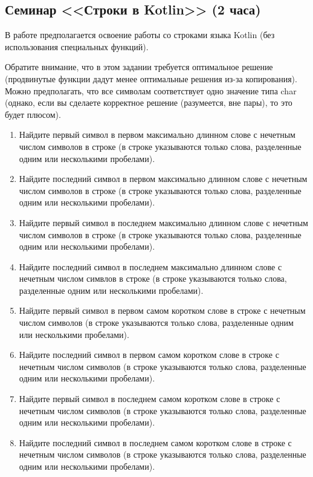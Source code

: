 \subsection{Семинар <<Строки в Kotlin>> (2 часа)}

В работе предполагается освоение работы со строками языка Kotlin (без использования специальных функций).

Обратите внимание, что в этом задании требуется оптимальное решение 
(продвинутые функции дадут менее оптимальные решения из-за копирования). Можно предполагать,
что все символам соответствует одно значение типа char (однако,
если вы сделаете корректное решение (разумеется, вне пары), то это будет плюсом).



\begin{enumerate}
\item Найдите первый символ в первом максимально длинном слове с нечетным числом символов в строке (в строке указываются только слова, разделенные одним или несколькими пробелами). 
\item Найдите последний символ в первом максимально длинном слове с нечетным числом символов в строке (в строке указываются только слова, разделенные одним или несколькими пробелами). 
\item Найдите первый символ в последнем максимально длинном слове с нечетным числом символов в строке (в строке указываются только слова, разделенные одним или несколькими пробелами). 
\item Найдите последний символ в последнем максимально длинном слове с нечетным числом симвлов в строке (в строке указываются только слова, разделенные одним или несколькими пробелами). 
\item Найдите первый символ в первом самом коротком слове в строке с нечетным числом символов (в строке указываются только слова, разделенные одним или несколькими пробелами). 
\item Найдите последний символ в первом самом коротком слове в строке с нечетным числом символов (в строке указываются только слова, разделенные одним или несколькими пробелами). 
\item Найдите первый символ в последнем самом коротком слове в строке с нечетным числом символов (в строке указываются только слова, разделенные одним или несколькими пробелами). 
\item Найдите последний символ в последнем самом коротком слове в строке с нечетным числом символов (в строке указываются только слова, разделенные одним или несколькими пробелами). 


\end{enumerate}
